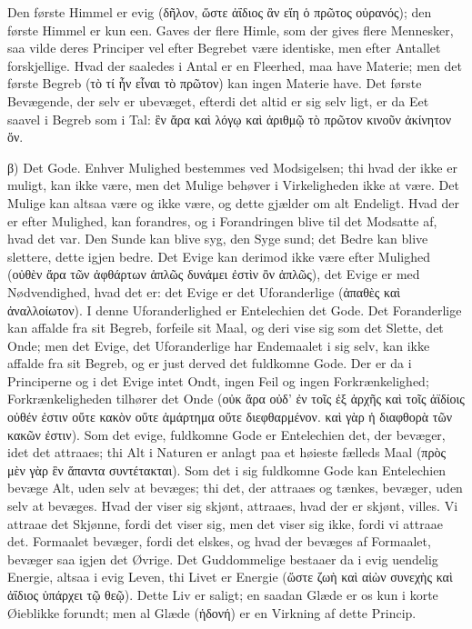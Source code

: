 \documentclass[12pt]{book}
\newcommand{\opage}[1]{\marginnote{\footnotesize\textit{[#1]}}}
\begin{document}
Den første Himmel er evig (δῆλον, ὥστε ἀΐδιος ἂν εἴη ὁ πρῶτος οὐρανός); den første Himmel er kun
een. Gaves der flere Himle, som der gives flere Mennesker, saa vilde deres Principer vel efter
Begrebet være identiske, men efter Antallet forskjellige. Hvad der saaledes i Antal er en
Fleerhed, maa have Materie; men det første Begreb (τὸ τί ἦν εἶναι τὸ πρῶτον) kan ingen Materie
have. Det første Bevægende, der selv er ubevæget, efterdi det altid er sig selv ligt, er da Eet
saavel i Begreb som i Tal: ἓν ἄρα καὶ λόγῳ καὶ ἀριθμῷ τὸ πρῶτον κινοῦν ἀκίνητον ὄν.

β) Det Gode. Enhver Mulighed bestemmes ved Modsigelsen; thi hvad der ikke er muligt, kan ikke
være, men det Mulige behøver i Virkeligheden ikke at være. Det Mulige kan altsaa være og ikke
være, og dette gjælder om alt Endeligt. Hvad der er efter Mulighed, kan forandres, og i
Forandringen blive til det Modsatte af, hvad det var. Den Sunde kan blive syg, den Syge sund; det
Bedre kan blive slettere, dette igjen bedre. Det Evige kan derimod ikke være efter Mulighed
(οὐθὲν ἄρα τῶν ἀφθάρτων ἁπλῶς δυνάμει ἐστὶν ὂν ἁπλῶς), det Evige er med Nødvendighed, hvad det er:
det Evige er det Uforanderlige (ἀπαθὲς καὶ ἀναλλοίωτον). I denne Uforanderlighed er Entelechien
det Gode. Det Foranderlige kan affalde fra sit Begreb, forfeile sit Maal, og deri vise sig som
det Slette, det Onde; men det Evige, det Uforanderlige har Endemaalet i sig selv, kan ikke
affalde fra sit Begreb, og er just derved det fuldkomne Gode. Der er da i Principerne og i det
Evige intet Ondt, ingen Feil og ingen Forkrænkelighed; Forkrænkeligheden tilhører det Onde (οὐκ
ἄρα οὐδ' ἐν τοῖς ἐξ ἀρχῆς καὶ τοῖς ἀϊδίοις οὐθέν ἐστιν οὔτε κακὸν οὔτε ἁμάρτημα
\opage{147} οὔτε διεφθαρμένον. καὶ γὰρ ἡ διαφθορὰ τῶν κακῶν ἐστιν). Som det evige, fuldkomne Gode er
Entelechien det, der bevæger, idet det attraaes; thi Alt i Naturen er anlagt paa et høieste
fælleds Maal (πρὸς μὲν γὰρ ἓν ἅπαντα συντέτακται). Som det i sig fuldkomne Gode kan Entelechien
bevæge Alt, uden selv at bevæges; thi det, der attraaes og tænkes, bevæger, uden selv at bevæges.
Hvad der viser sig skjønt, attraaes, hvad der er skjønt, villes. Vi attraae det Skjønne, fordi
det viser sig, men det viser sig ikke, fordi vi attraae det. Formaalet bevæger, fordi det elskes,
og hvad der bevæges af Formaalet, bevæger saa igjen det Øvrige. Det Guddommelige bestaaer da i
evig uendelig Energie, altsaa i evig Leven, thi Livet er Energie (ὥστε ζωὴ καὶ αἰὼν συνεχὴς καὶ
ἀΐδιος ὑπάρχει τῷ θεῷ). Dette Liv er saligt; en saadan Glæde er os kun i korte Øieblikke forundt;
men al Glæde (ἡδονή) er en Virkning af dette Princip.
\end{document}
